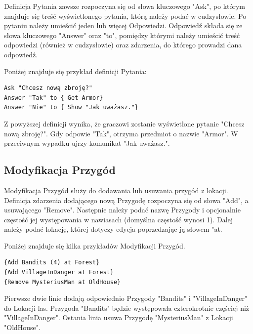 \documentclass	{xmgr}
\begin{document}
Definicja Pytania zawsze rozpoczyna się od słowa kluczowego "Ask", po którym znajduje się treść wyświetlonego pytania, którą należy podać w cudzysłowie. Po pytaniu należy umieścić jeden lub więcej Odpowiedzi. Odpowiedź składa się ze słowa kluczowego "Answer" oraz "to", pomiędzy którymi należy umieścić treść odpowiedzi (również w cudzysłowie) oraz zdarzenia, do którego prowadzi dana odpowiedź. 

Poniżej znajduje się przykład definicji Pytania:
\begin{lstlisting}
Ask "Chcesz nową zbroję?"
Answer "Tak" to { Get Armor}
Answer "Nie" to { Show "Jak uważasz."}
\end{lstlisting}
Z powyższej definicji wynika, że graczowi zostanie wyświetlone pytanie "Chcesz nową zbroję?". Gdy odpowie "Tak", otrzyma przedmiot o nazwie "Armor". W przeciwnym wypadku ujrzy komunikat "Jak uważasz.".


\subsection*{Modyfikacja Przygód}
Modyfikacja Przygód służy do dodawania lub usuwania przygód z lokacji. 
Definicja zdarzenia dodającego nową Przygodę rozpoczyna się od słowa "Add", a usuwającego "Remove". Następnie należy podać nazwę Przygody i opcjonalnie częstość jej występowania w nawiasach (domyślna częstość wynosi 1). Dalej należy podać lokację, której dotyczy edycja poprzedzając ją słowem "at.

Poniżej znajduje się kilka przykładów Modyfikacji Przygód. 
\begin{lstlisting}
{Add Bandits (4) at Forest}
{Add VillageInDanger at Forest}
{Remove MysteriusMan at OldHouse}
\end{lstlisting}
Pierwsze dwie linie dodają odpowiednio Przygody "Bandits" i "VillageInDanger" do Lokacji las. Przygoda "Bandits" będzie występowała czterokrotnie częściej niż "VillageInDanger". Ostania linia usuwa Przygodę "MysteriusMan" z Lokacji "OldHouse".
\end{document}

